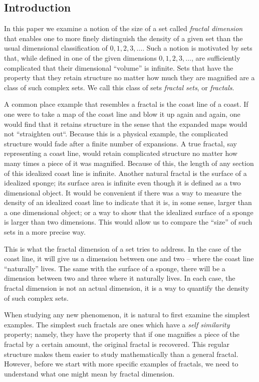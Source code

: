 \subsection{Introduction}
{\parindent=0pt
In this paper we examine a notion of the size of a set called 
{\it fractal dimension} that enables one to more
finely distinguish the density of a given set than the usual
dimensional classification of $0, 1, 2, 3, \ldots$.%
Such a notion is motivated by sets that, while defined in one of the given
dimensions $0, 1, 2, 3, \dots$, are sufficiently
complicated that their dimensional ``volume'' is infinite. 
Sets that have the property that they retain structure no matter how much 
they are magnified are a class of such complex sets. We call this class of sets
{\it fractal sets}, or
{\it fractals}. 

A common place example that resembles a fractal is the coast line of
a coast. If one were to take a map of the coast line and blow it up
again and again, one would find that it retains structure in the
sense that the expanded maps would not ``straighten out``.
Because this is a physical example, the complicated structure would fade
after a finite number of expansions. A true fractal, say representing a 
coast line, would retain complicated
structure no matter how many times a piece of it was magnified.
Because of this, the length of any section of this idealized coast line is
infinite. Another natural fractal is the surface of a idealized sponge; 
its surface area is infinite even though it is defined as a two 
dimensional object. It would be convenient if there was a way to
measure the density of an idealized coast line to
indicate that it is, in some sense, larger than a one dimensional
object; or a way to show that the idealized surface of a sponge is larger than
two dimensions. This would allow us to compare the ``size'' of such sets
in a more precise way.

This is what the fractal dimension of a set tries to address. 
In the case of the coast line, it will give us a dimension between one and two
-- where the coast line ``naturally'' lives. The same with the surface of
a sponge,
there will be a dimension between two and three where it naturally lives. In
each case, the fractal dimension is not an actual dimension, 
it is a way to quantify the density of such complex sets.

When studying any new phenomenon, it is natural to first examine the
simplest examples. The simplest such fractals are ones which have a
{\it self similarity} property; namely, they have the property that if
one magnifies a piece of the fractal by a certain amount, the original
fractal is recovered. This regular structure makes them easier to
study mathematically than a general fractal. However, before we start
with more specific examples of fractals, we need to understand what 
one might mean by fractal dimension.

}
